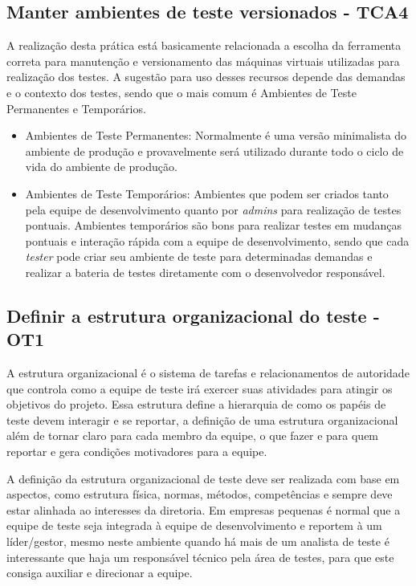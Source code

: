 \subsection{Manter ambientes de teste versionados - TCA4}

A realização desta prática está basicamente relacionada a escolha da ferramenta correta para manutenção e versionamento das máquinas virtuais utilizadas para realização dos testes. A sugestão para uso desses recursos depende das demandas e o contexto dos testes, sendo que o mais comum é Ambientes de Teste Permanentes e Temporários.

\begin{itemize}
    \item Ambientes de Teste Permanentes: Normalmente é uma versão minimalista do ambiente de produção e provavelmente será utilizado durante todo o ciclo de vida do ambiente de produção.
    \item Ambientes de Teste Temporários: Ambientes que podem ser criados tanto pela equipe de desenvolvimento quanto por \textit{admins} para realização de testes pontuais. Ambientes temporários são bons para realizar testes em mudanças pontuais e interação rápida com a equipe de desenvolvimento, sendo que cada \textit{tester} pode criar seu ambiente de teste para determinadas demandas e realizar a bateria de testes diretamente com o desenvolvedor responsável.
\end{itemize}

\subsection{Definir a estrutura organizacional do teste - OT1}

A estrutura organizacional é o sistema de tarefas e relacionamentos de autoridade que controla como a equipe de teste irá exercer suas atividades para atingir os objetivos do projeto. Essa estrutura define a hierarquia de como os papéis de teste devem interagir e se reportar, a definição de uma estrutura organizacional além de tornar claro para cada membro da equipe, o que fazer e para quem reportar e gera condições motivadores para a equipe.

A definição da estrutura organizacional de teste deve ser realizada com base em aspectos, como estrutura física, normas, métodos, competências e sempre deve estar alinhada ao interesses da diretoria. Em empresas pequenas é normal que a equipe de teste seja integrada à equipe de desenvolvimento e reportem à um líder/gestor, mesmo neste ambiente quando há mais de um analista de teste é interessante que haja um responsável técnico pela área de testes, para que este consiga auxiliar e direcionar a equipe.

